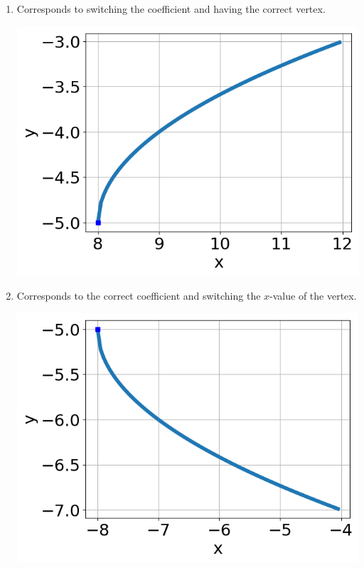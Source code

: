 \documentclass{article}[10pt]
\begin{document}
\begin{enumerate}[label=\Alph*.]
\item Corresponds to switching the coefficient and having the correct vertex. 
\begin{center}\includegraphics[scale=0.5]{../Figures/question23AA.png}\end{center} 
 
\item Corresponds to the correct coefficient and switching the $x$-value of the vertex. 
\begin{center}\includegraphics[scale=0.5]{../Figures/question23AB.png}\end{center} 
 

\end{enumerate}
\end{document}
